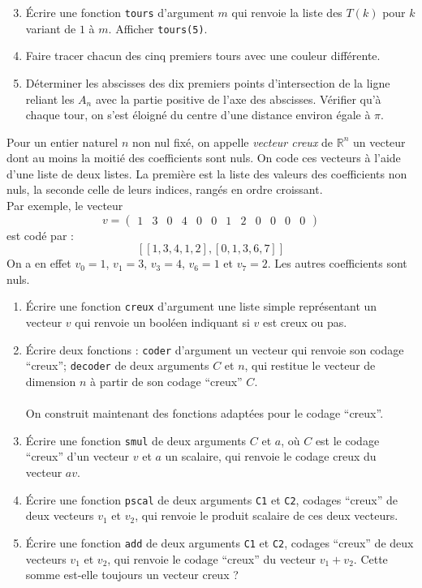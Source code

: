 \begin{exercice}
\begin{enumerate}
\setcounter{enumi}{2}
\item \'Ecrire une fonction \texttt{tours} d'argument $m$ qui renvoie la liste des $T(k)$ pour $k$ variant de $1$ à $m$. Afficher \texttt{tours(5)}.
\item Faire tracer chacun des cinq premiers tours avec une couleur différente.
\item Déterminer les abscisses des dix premiers points d'intersection de la ligne reliant les $A_n$ avec la partie positive de l'axe des abscisses. Vérifier qu'à chaque tour, on s'est éloigné du centre d'une distance environ égale à $\pi$.
\end{enumerate}
\end{exercice}





\begin{exercice}
Pour un entier naturel $n$ non nul fixé, on appelle \textit{vecteur creux} de $\mathbb{R} ^n$ un vecteur dont au moins la moitié des coefficients sont nuls. On code ces vecteurs à l'aide d'une liste de deux listes. La première est la liste des valeurs des coefficients non nuls, la seconde celle de leurs indices, rangés en ordre croissant.\\
Par exemple, le vecteur
$$v=\left( \begin{array}{cccccccccccc}
1 & 3 & 0 & 4 & 0 & 0 & 1 & 2 & 0 & 0 & 0 & 0
\end{array}\right)$$ est codé par : $$ [[1,3,4,1,2],[0,1,3,6,7]]$$
On a en effet $v_0=1$, $v_1=3$, $v_3=4$, $v_6=1$ et $v_7=2$. Les autres coefficients sont nuls.
\begin{enumerate}
\item \'Ecrire une fonction \texttt{creux} d'argument une liste simple représentant un vecteur $v$ qui renvoie un booléen indiquant si $v$ est creux ou pas.
\item \'Ecrire deux fonctions : \texttt{coder} d'argument un vecteur qui renvoie son codage ``creux''; \texttt{decoder} de deux arguments $C$ et $n$, qui restitue le vecteur de dimension $n$ à partir de son codage ``creux'' $C$.\\
\\
On construit maintenant des fonctions adaptées pour le codage ``creux''.
\item \'Ecrire une fonction \texttt{smul} de deux arguments $C$ et $a$, où $C$ est le codage ``creux'' d'un vecteur $v$ et $a$ un scalaire, qui renvoie le codage creux du vecteur $av$.
\item \'Ecrire une fonction \texttt{pscal} de deux arguments \texttt{C1} et \texttt{C2}, codages ``creux'' de deux vecteurs $v_1$ et $v_2$, qui renvoie le produit scalaire de ces deux vecteurs. 
\item \'Ecrire une fonction \texttt{add} de deux arguments \texttt{C1} et \texttt{C2}, codages ``creux'' de deux vecteurs $v_1$ et $v_2$, qui renvoie le codage ``creux'' du vecteur $v_1+v_2$. Cette somme est-elle toujours un vecteur creux ?
\end{enumerate}
\end{exercice}




